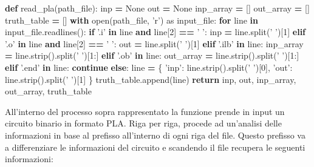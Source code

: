 \documentclass[italian,]{book}
\newenvironment{Shaded}{\begin{snugshade}}{\end{snugshade}}
\newcommand{\BuiltInTok}[1]{#1}
\newcommand{\ControlFlowTok}[1]{\textcolor[rgb]{0.13,0.29,0.53}{\textbf{#1}}}
\newcommand{\DecValTok}[1]{\textcolor[rgb]{0.00,0.00,0.81}{#1}}
\newcommand{\ImportTok}[1]{#1}
\newcommand{\KeywordTok}[1]{\textcolor[rgb]{0.13,0.29,0.53}{\textbf{#1}}}
\newcommand{\NormalTok}[1]{#1}
\newcommand{\OperatorTok}[1]{\textcolor[rgb]{0.81,0.36,0.00}{\textbf{#1}}}
\newcommand{\StringTok}[1]{\textcolor[rgb]{0.31,0.60,0.02}{#1}}
\newcommand{\VariableTok}[1]{\textcolor[rgb]{0.00,0.00,0.00}{#1}}
\begin{document}
\begin{Shaded}
\begin{Highlighting}[]
\KeywordTok{def}\NormalTok{ read_pla(path_file):}
\NormalTok{  inp }\OperatorTok{=} \VariableTok{None}
\NormalTok{  out }\OperatorTok{=} \VariableTok{None}
\NormalTok{  inp_array }\OperatorTok{=}\NormalTok{ []}
\NormalTok{  out_array }\OperatorTok{=}\NormalTok{ []}
\NormalTok{  truth_table }\OperatorTok{=}\NormalTok{ []}
  \ControlFlowTok{with} \BuiltInTok{open}\NormalTok{(path_file, }\StringTok{'r'}\NormalTok{) }\ImportTok{as}\NormalTok{ input_file:}
    \ControlFlowTok{for}\NormalTok{ line }\KeywordTok{in}\NormalTok{ input_file.readlines():}
      \ControlFlowTok{if} \StringTok{'.i'} \KeywordTok{in}\NormalTok{ line }\KeywordTok{and}\NormalTok{ line[}\DecValTok{2}\NormalTok{] }\OperatorTok{==} \StringTok{' '}\NormalTok{:}
\NormalTok{        inp }\OperatorTok{=}\NormalTok{ line.split(}\StringTok{' '}\NormalTok{)[}\DecValTok{1}\NormalTok{]}
      \ControlFlowTok{elif} \StringTok{'.o'} \KeywordTok{in}\NormalTok{ line }\KeywordTok{and}\NormalTok{ line[}\DecValTok{2}\NormalTok{] }\OperatorTok{==} \StringTok{' '}\NormalTok{:}
\NormalTok{        out }\OperatorTok{=}\NormalTok{ line.split(}\StringTok{' '}\NormalTok{)[}\DecValTok{1}\NormalTok{]}
      \ControlFlowTok{elif} \StringTok{'.ilb'} \KeywordTok{in}\NormalTok{ line:}
\NormalTok{        inp_array }\OperatorTok{=}\NormalTok{ line.strip().split(}\StringTok{' '}\NormalTok{)[}\DecValTok{1}\NormalTok{:]}
      \ControlFlowTok{elif} \StringTok{'.ob'} \KeywordTok{in}\NormalTok{ line:}
\NormalTok{        out_array }\OperatorTok{=}\NormalTok{ line.strip().split(}\StringTok{' '}\NormalTok{)[}\DecValTok{1}\NormalTok{:]}
      \ControlFlowTok{elif} \StringTok{'.end'} \KeywordTok{in}\NormalTok{ line:}
        \ControlFlowTok{continue}
      \ControlFlowTok{else}\NormalTok{:}
\NormalTok{        line }\OperatorTok{=}\NormalTok{ \{}
          \StringTok{'inp'}\NormalTok{:  line.strip().split(}\StringTok{' '}\NormalTok{)[}\DecValTok{0}\NormalTok{],}
          \StringTok{'out'}\NormalTok{:  line.strip().split(}\StringTok{' '}\NormalTok{)[}\DecValTok{1}\NormalTok{]}
\NormalTok{        \}}
\NormalTok{        truth_table.append(line)}
  \ControlFlowTok{return}\NormalTok{ inp, out, inp_array, out_array, truth_table}
\end{Highlighting}
\end{Shaded}

All'interno del processo sopra rappresentato la funzione prende in input un circuito binario in formato PLA. Riga per riga, procede ad un'analisi delle informazioni in base al prefisso all'interno di ogni riga del file. Questo prefisso va a differenziare le informazioni del circuito e scandendo il file recupera le seguenti informazioni:
\end{document}
